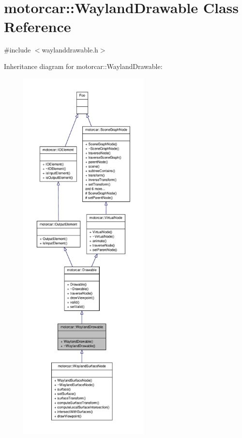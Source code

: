 \hypertarget{classmotorcar_1_1WaylandDrawable}{\section{motorcar\-:\-:Wayland\-Drawable Class Reference}
\label{classmotorcar_1_1WaylandDrawable}
}


{\ttfamily \#include $<$waylanddrawable.\-h$>$}



Inheritance diagram for motorcar\-:\-:Wayland\-Drawable\-:
\nopagebreak
\begin{figure}[H]
\begin{center}
\leavevmode
\includegraphics[height=550pt]{classmotorcar_1_1WaylandDrawable__inherit__graph}
\end{center}
\end{figure}


